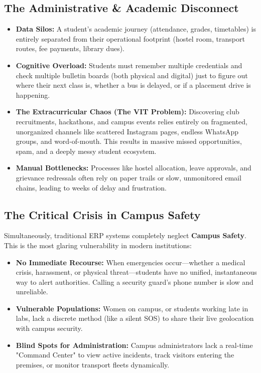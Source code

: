 \documentclass[11pt,a4paper]{article}
\begin{document}
\subsection{The Administrative \& Academic Disconnect}
\begin{itemize}
    \item \textbf{Data Silos:} A student's academic journey (attendance, grades, timetables) is entirely separated from their operational footprint (hostel room, transport routes, fee payments, library dues).
    \item \textbf{Cognitive Overload:} Students must remember multiple credentials and check multiple bulletin boards (both physical and digital) just to figure out where their next class is, whether a bus is delayed, or if a placement drive is happening.
    \item \textbf{The Extracurricular Chaos (The VIT Problem):} Discovering club recruitments, hackathons, and campus events relies entirely on fragmented, unorganized channels like scattered Instagram pages, endless WhatsApp groups, and word-of-mouth. This results in massive missed opportunities, spam, and a deeply messy student ecosystem.
    \item \textbf{Manual Bottlenecks:} Processes like hostel allocation, leave approvals, and grievance redressals often rely on paper trails or slow, unmonitored email chains, leading to weeks of delay and frustration.
\end{itemize}

\subsection{The Critical Crisis in Campus Safety}
Simultaneously, traditional ERP systems completely neglect \textbf{Campus Safety}. This is the most glaring vulnerability in modern institutions:
\begin{itemize}
    \item \textbf{No Immediate Recourse:} When emergencies occur—whether a medical crisis, harassment, or physical threat—students have no unified, instantaneous way to alert authorities. Calling a security guard's phone number is slow and unreliable.
    \item \textbf{Vulnerable Populations:} Women on campus, or students working late in labs, lack a discrete method (like a silent SOS) to share their live geolocation with campus security.
    \item \textbf{Blind Spots for Administration:} Campus administrators lack a real-time "Command Center" to view active incidents, track visitors entering the premises, or monitor transport fleets dynamically. 
\end{itemize}
\end{document}
